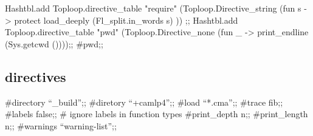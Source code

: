\begin{ocamlcode}
Hashtbl.add
    Toploop.directive_table
    "require"
    (Toploop.Directive_string
       (fun s ->
	  protect load_deeply (Fl_split.in_words s)
       ))
;;
Hashtbl.add Toploop.directive_table "pwd"
(Toploop.Directive_none (fun _ -> 
  print_endline (Sys.getcwd ())));;
#pwd;;
\end{ocamlcode}

\subsection{directives}
\begin{bashcode}
  #directory ``_build'';;
  #diretory ``+camlp4'';;
  #load ``*.cma'';;
  #trace fib;;
  #labels false;;  # ignore labels in function types
  #print_depth n;;
  #print_length n;;
  #warnings ``warning-list'';;
\end{bashcode}  



